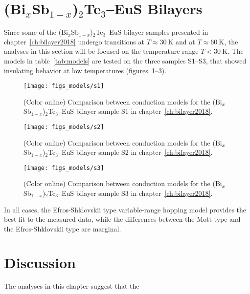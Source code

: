 \section{(Bi$_x$Sb$_{1-x}$)$_2$Te$_3$--EuS Bilayers}
Since some of the (Bi$_x$Sb$_{1-x}$)$_2$Te$_3$--EuS bilayer samples presented in chapter~\ref{ch:bilayer2018} undergo transitions at $T\approx 30~\mathrm{K}$ and at $T \approx 60~\mathrm{K}$, the analyses in this section will be focused on the temperature range $T < 30~\mathrm{K}$. The models in table~\ref{tab:models} are tested on the three samples S1--S3, that showed insulating behavior at low temperatures (figures~\ref{fig:models_s1}--\ref{fig:models_s3}).%
%
\begin{figure}[h!]%
    \centering%
    \texttt{[image: figs\_models/s1]}%
    \caption[Conduction model comparison: (Bi$_x$Sb$_{1-x}$)$_2$Te$_3$--EuS bilayer: S1]{\label{fig:models_s1}(Color online) Comparison between conduction models for the (Bi$_x$Sb$_{1-x}$)$_2$Te$_3$--EuS bilayer sample S1 in chapter~\ref{ch:bilayer2018}.}%
\end{figure}%
%
\begin{figure}[h!]%
    \centering%
    \texttt{[image: figs\_models/s2]}%
    \caption[Conduction model comparison: (Bi$_x$Sb$_{1-x}$)$_2$Te$_3$--EuS bilayer: S2]{\label{fig:models_s2}(Color online) Comparison between conduction models for the (Bi$_x$Sb$_{1-x}$)$_2$Te$_3$--EuS bilayer sample S2 in chapter~\ref{ch:bilayer2018}.}%
\end{figure}%
%
\begin{figure}[h!]%
    \centering%
    \texttt{[image: figs\_models/s3]}%
    \caption[Conduction model comparison: (Bi$_x$Sb$_{1-x}$)$_2$Te$_3$--EuS bilayer: S3]{\label{fig:models_s3}(Color online) Comparison between conduction models for the (Bi$_x$Sb$_{1-x}$)$_2$Te$_3$--EuS bilayer sample S3 in chapter~\ref{ch:bilayer2018}.}%
\end{figure}%

In all cases, the Efros-Shklovskii type variable-range hopping model provides the best fit to the measured data, while the differences between the Mott type and the Efros-Shklovskii type are marginal.

\section{Discussion}
The analyses in this chapter suggest that the 